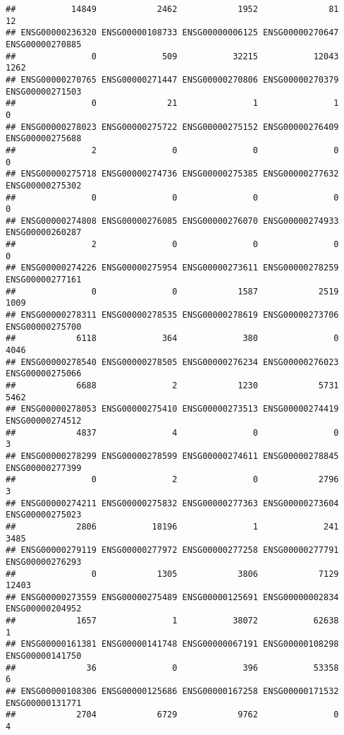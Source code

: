 \documentclass[
]{article}
\begin{document}
\begin{verbatim}
##           14849            2462            1952              81              12 
## ENSG00000236320 ENSG00000108733 ENSG00000006125 ENSG00000270647 ENSG00000270885 
##               0             509           32215           12043            1262 
## ENSG00000270765 ENSG00000271447 ENSG00000270806 ENSG00000270379 ENSG00000271503 
##               0              21               1               1               0 
## ENSG00000278023 ENSG00000275722 ENSG00000275152 ENSG00000276409 ENSG00000275688 
##               2               0               0               0               0 
## ENSG00000275718 ENSG00000274736 ENSG00000275385 ENSG00000277632 ENSG00000275302 
##               0               0               0               0               0 
## ENSG00000274808 ENSG00000276085 ENSG00000276070 ENSG00000274933 ENSG00000260287 
##               2               0               0               0               0 
## ENSG00000274226 ENSG00000275954 ENSG00000273611 ENSG00000278259 ENSG00000277161 
##               0               0            1587            2519            1009 
## ENSG00000278311 ENSG00000278535 ENSG00000278619 ENSG00000273706 ENSG00000275700 
##            6118             364             380               0            4046 
## ENSG00000278540 ENSG00000278505 ENSG00000276234 ENSG00000276023 ENSG00000275066 
##            6688               2            1230            5731            5462 
## ENSG00000278053 ENSG00000275410 ENSG00000273513 ENSG00000274419 ENSG00000274512 
##            4837               4               0               0               3 
## ENSG00000278299 ENSG00000278599 ENSG00000274611 ENSG00000278845 ENSG00000277399 
##               0               2               0            2796               3 
## ENSG00000274211 ENSG00000275832 ENSG00000277363 ENSG00000273604 ENSG00000275023 
##            2806           18196               1             241            3485 
## ENSG00000279119 ENSG00000277972 ENSG00000277258 ENSG00000277791 ENSG00000276293 
##               0            1305            3806            7129           12403 
## ENSG00000273559 ENSG00000275489 ENSG00000125691 ENSG00000002834 ENSG00000204952 
##            1657               1           38072           62638               1 
## ENSG00000161381 ENSG00000141748 ENSG00000067191 ENSG00000108298 ENSG00000141750 
##              36               0             396           53358               6 
## ENSG00000108306 ENSG00000125686 ENSG00000167258 ENSG00000171532 ENSG00000131771 
##            2704            6729            9762               0               4 

\end{verbatim}
\end{document}

